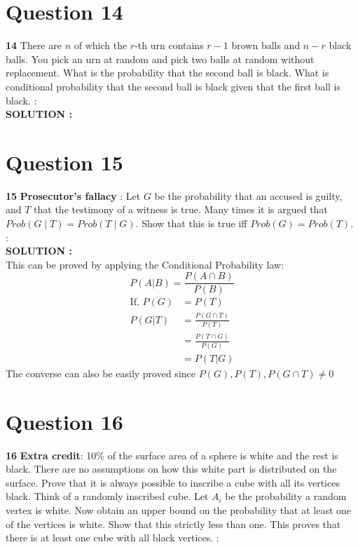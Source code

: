 \documentclass{article}
\begin{document}
\section{Question 14}
\label{Q14}
\textbf{14} There are $n$ of which the $r$-th urn contains $r - 1$ brown balls and $n - r$ black balls. You pick an urn at random and pick two balls at random without replacement. What is the probability that the second ball is black. What is conditional probability that the second ball is black given that the first ball is black.  : \\


\hspace{1em} \large{\textbf{SOLUTION :}} \\

\section{Question 15}
\label{Q15}
\textbf{15} \textbf{Prosecutor’s fallacy} : Let $G$ be the probability that an accused is guilty, and $T$ that the testimony of a witness is true. Many times it is argued that $Prob (G \mid T) = Prob (T \mid G)$. Show that this is true iff $Prob (G) = Prob (T).$ : \\ 

\hspace{1em} \large{\textbf{SOLUTION :}} \\
    This can be proved by applying the Conditional Probability law:
    $$P(A|B) = \frac{P(A\cap B)}{P(B)}$$
\begin{align*}
    \text{If, } P(G) &= P(T)\\
    P(G|T)&=\frac{P(G\cap T)}{P(T)}\\
    &=\frac{P(T\cap G)}{P(G)}\\
    &=P(T|G)
\end{align*}
The converse can also be easily proved since  $P(G),P(T),P(G\cap T)\neq0$
\section{Question 16}
\label{Q16}
\textbf{16} \textbf{Extra credit}: 10\% of the surface area of a sphere is white and the rest is black. There are no assumptions on how this white part is distributed on the surface. Prove that it is always possible to inscribe a cube with all its vertices black. Think of a randomly inscribed cube. Let $A_i$ be the probability a random vertex is white. Now obtain an upper bound on the probability that at least one of the vertices is white. Show that this strictly less than one. This proves that there is at least one cube with all black vertices.
 : \\
\end{document}
